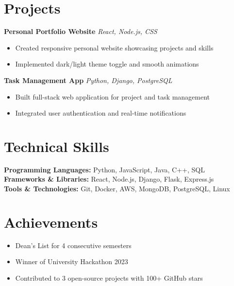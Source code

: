 \documentclass[11pt,a4paper]{article}
\begin{document}
\section{Projects}
\textbf{Personal Portfolio Website} \hfill \textit{React, Node.js, CSS}
\begin{itemize}
    \item Created responsive personal website showcasing projects and skills
    \item Implemented dark/light theme toggle and smooth animations
\end{itemize}

\textbf{Task Management App} \hfill \textit{Python, Django, PostgreSQL}
\begin{itemize}
    \item Built full-stack web application for project and task management
    \item Integrated user authentication and real-time notifications
\end{itemize}

\section{Technical Skills}
\textbf{Programming Languages:} Python, JavaScript, Java, C++, SQL \\
\textbf{Frameworks \& Libraries:} React, Node.js, Django, Flask, Express.js \\
\textbf{Tools \& Technologies:} Git, Docker, AWS, MongoDB, PostgreSQL, Linux

\section{Achievements}
\begin{itemize}
    \item Dean's List for 4 consecutive semesters
    \item Winner of University Hackathon 2023
    \item Contributed to 3 open-source projects with 100+ GitHub stars
\end{itemize}
\end{document}
